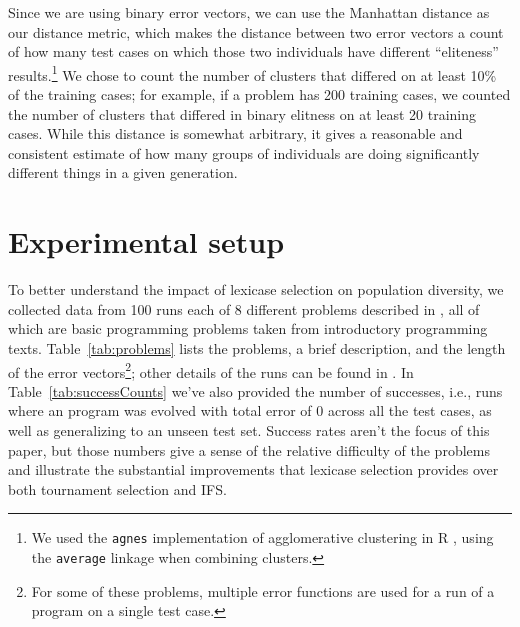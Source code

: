 Since we are using binary error vectors, we can use the 
Manhattan distance as our distance metric, which makes the distance between two error vectors
a count of how many test cases on which those two individuals have different ``eliteness'' 
results.\footnote{We used the \texttt{agnes} \citep{cluster} implementation of 
	agglomerative clustering in R \citep{R}, using the \texttt{average} linkage when 
	combining clusters.} 
We chose to count the number of clusters that differed on at least 10\% of the training cases; 
for example, if a problem has 200 training cases, we counted the number of clusters that differed 
in binary elitness on at least 20 training cases. While this distance is somewhat arbitrary, 
it gives a reasonable and consistent estimate of how many groups of individuals are doing 
significantly different things in a given generation.

\section{Experimental setup}
\label{sec:setup}

To better understand the impact of lexicase selection on population diversity, we collected data
from 100 runs each of 8 different problems described in \cite{Helmuth:2015:GECCO}, all of which are
basic programming problems taken from introductory programming texts. Table~\ref{tab:problems} lists
the problems, a brief description, and the length of the error vectors\footnote{For some of these problems, multiple error functions are used for a run of a program on a single test case.}; other details of the runs can be
found in \cite{Helmuth:2015:GECCO}. In Table~\ref{tab:successCounts} we've also provided the number 
of successes, i.e., runs where an program was evolved with total error of 0 across all the test cases, as well as generalizing to an unseen test set.
Success rates aren't the focus of this paper, but those numbers give a sense of the relative
difficulty of the problems and illustrate the substantial improvements that lexicase selection
provides over both tournament selection and IFS.

